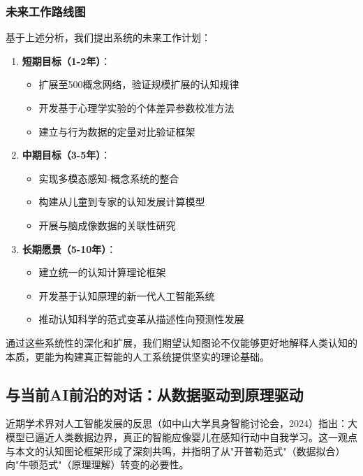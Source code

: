 \documentclass[12pt,a4paper]{article}
\begin{document}
\subsubsection{未来工作路线图}

基于上述分析，我们提出系统的未来工作计划：

\begin{enumerate}
\item \textbf{短期目标（1-2年）}：
\begin{itemize}
\item 扩展至500概念网络，验证规模扩展的认知规律
\item 开发基于心理学实验的个体差异参数校准方法
\item 建立与行为数据的定量对比验证框架
\end{itemize}

\item \textbf{中期目标（3-5年）}：
\begin{itemize}
\item 实现多模态感知-概念系统的整合
\item 构建从儿童到专家的认知发展计算模型
\item 开展与脑成像数据的关联性研究
\end{itemize}

\item \textbf{长期愿景（5-10年）}：
\begin{itemize}
\item 建立统一的认知计算理论框架
\item 开发基于认知原理的新一代人工智能系统
\item 推动认知科学的范式变革从描述性向预测性发展
\end{itemize}
\end{enumerate}

通过这些系统性的深化和扩展，我们期望认知图论不仅能够更好地解释人类认知的本质，更能为构建真正智能的人工系统提供坚实的理论基础。

\subsection{与当前AI前沿的对话：从数据驱动到原理驱动}

近期学术界对人工智能发展的反思（如中山大学具身智能讨论会，2024）指出：大模型已逼近人类数据边界，真正的智能应像婴儿在感知行动中自我学习。这一观点与本文的认知图论框架形成了深刻共鸣，并指明了从"开普勒范式"（数据拟合）向"牛顿范式"（原理理解）转变的必要性。
\end{document}

